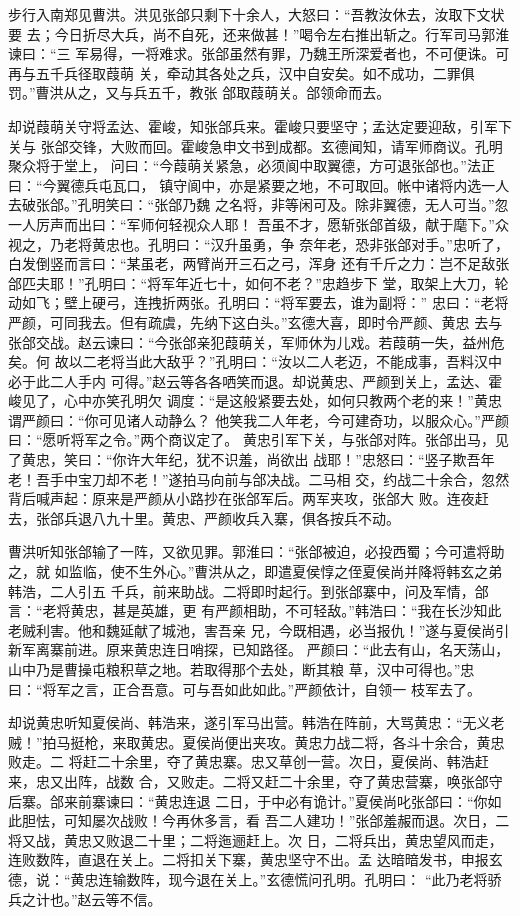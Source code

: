 步行入南郑见曹洪。洪见张郃只剩下十余人，大怒曰：“吾教汝休去，汝取下文状要
去；今日折尽大兵，尚不自死，还来做甚！”喝令左右推出斩之。行军司马郭淮谏曰：“三
军易得，一将难求。张郃虽然有罪，乃魏王所深爱者也，不可便诛。可再与五千兵径取葭萌
关，牵动其各处之兵，汉中自安矣。如不成功，二罪俱罚。”曹洪从之，又与兵五千，教张
郃取葭萌关。郃领命而去。

却说葭萌关守将孟达、霍峻，知张郃兵来。霍峻只要坚守；孟达定要迎敌，引军下关与
张郃交锋，大败而回。霍峻急申文书到成都。玄德闻知，请军师商议。孔明聚众将于堂上，
问曰：“今葭萌关紧急，必须阆中取翼德，方可退张郃也。”法正曰：“今翼德兵屯瓦口，
镇守阆中，亦是紧要之地，不可取回。帐中诸将内选一人去破张郃。”孔明笑曰：“张郃乃魏
之名将，非等闲可及。除非翼德，无人可当。”忽一人厉声而出曰：“军师何轻视众人耶！
吾虽不才，愿斩张郃首级，献于麾下。”众视之，乃老将黄忠也。孔明曰：“汉升虽勇，争
奈年老，恐非张郃对手。”忠听了，白发倒竖而言曰：“某虽老，两臂尚开三石之弓，浑身
还有千斤之力：岂不足敌张郃匹夫耶！”孔明曰：“将军年近七十，如何不老？”忠趋步下
堂，取架上大刀，轮动如飞；壁上硬弓，连拽折两张。孔明曰：“将军要去，谁为副将：”
忠曰：“老将严颜，可同我去。但有疏虞，先纳下这白头。”玄德大喜，即时令严颜、黄忠
去与张郃交战。赵云谏曰：“今张郃亲犯葭萌关，军师休为儿戏。若葭萌一失，益州危矣。何
故以二老将当此大敌乎？”孔明曰：“汝以二人老迈，不能成事，吾料汉中必于此二人手内
可得。”赵云等各各哂笑而退。却说黄忠、严颜到关上，孟达、霍峻见了，心中亦笑孔明欠
调度：“是这般紧要去处，如何只教两个老的来！”黄忠谓严颜曰：“你可见诸人动静么？
他笑我二人年老，今可建奇功，以服众心。”严颜曰：“愿听将军之令。”两个商议定了。
黄忠引军下关，与张郃对阵。张郃出马，见了黄忠，笑曰：“你许大年纪，犹不识羞，尚欲出
战耶！”忠怒曰：“竖子欺吾年老！吾手中宝刀却不老！”遂拍马向前与郃决战。二马相
交，约战二十余合，忽然背后喊声起：原来是严颜从小路抄在张郃军后。两军夹攻，张郃大
败。连夜赶去，张郃兵退八九十里。黄忠、严颜收兵入寨，俱各按兵不动。

曹洪听知张郃输了一阵，又欲见罪。郭淮曰：“张郃被迫，必投西蜀；今可遣将助之，就
如监临，使不生外心。”曹洪从之，即遣夏侯惇之侄夏侯尚并降将韩玄之弟韩浩，二人引五
千兵，前来助战。二将即时起行。到张郃寨中，问及军情，郃言：“老将黄忠，甚是英雄，更
有严颜相助，不可轻敌。”韩浩曰：“我在长沙知此老贼利害。他和魏延献了城池，害吾亲
兄，今既相遇，必当报仇！”遂与夏侯尚引新军离寨前进。原来黄忠连日哨探，已知路径。
严颜曰：“此去有山，名天荡山，山中乃是曹操屯粮积草之地。若取得那个去处，断其粮
草，汉中可得也。”忠曰：“将军之言，正合吾意。可与吾如此如此。”严颜依计，自领一
枝军去了。

却说黄忠听知夏侯尚、韩浩来，遂引军马出营。韩浩在阵前，大骂黄忠：“无义老
贼！”拍马挺枪，来取黄忠。夏侯尚便出夹攻。黄忠力战二将，各斗十余合，黄忠败走。二
将赶二十余里，夺了黄忠寨。忠又草创一营。次日，夏侯尚、韩浩赶来，忠又出阵，战数
合，又败走。二将又赶二十余里，夺了黄忠营寨，唤张郃守后寨。郃来前寨谏曰：“黄忠连退
二日，于中必有诡计。”夏侯尚叱张郃曰：“你如此胆怯，可知屡次战败！今再休多言，看
吾二人建功！”张郃羞赧而退。次日，二将又战，黄忠又败退二十里；二将迤逦赶上。次
日，二将兵出，黄忠望风而走，连败数阵，直退在关上。二将扣关下寨，黄忠坚守不出。孟
达暗暗发书，申报玄德，说：“黄忠连输数阵，现今退在关上。”玄德慌问孔明。孔明曰：
“此乃老将骄兵之计也。”赵云等不信。

